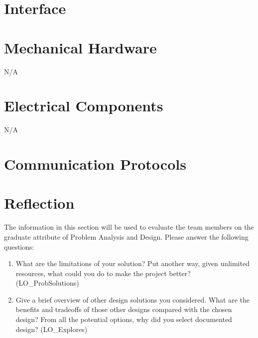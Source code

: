 \documentclass[12pt, titlepage]{article}
\begin{document}
\section{Interface}


\section{Mechanical Hardware}

N/A

\section{Electrical Components}

N/A

\section{Communication Protocols}

\section{Reflection}

The information in this section will be used to evaluate the team members on the
graduate attribute of Problem Analysis and Design.  Please answer the following questions:

\begin{enumerate}
  \item What are the limitations of your solution?  Put another way, given
  unlimited resources, what could you do to make the project better? (LO\_ProbSolutions)
  \item Give a brief overview of other design solutions you considered.  What
  are the benefits and tradeoffs of those other designs compared with the chosen
  design?  From all the potential options, why did you select documented design?
  (LO\_Explores)
\end{enumerate}
\end{document}
